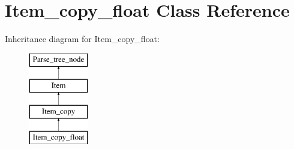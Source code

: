 \hypertarget{classItem__copy__float}{}\section{Item\+\_\+copy\+\_\+float Class Reference}
\label{classItem__copy__float}
Inheritance diagram for Item\+\_\+copy\+\_\+float\+:\begin{figure}[H]
\begin{center}
\leavevmode
\includegraphics[height=4.000000cm]{classItem__copy__float}
\end{center}
\end{figure}
